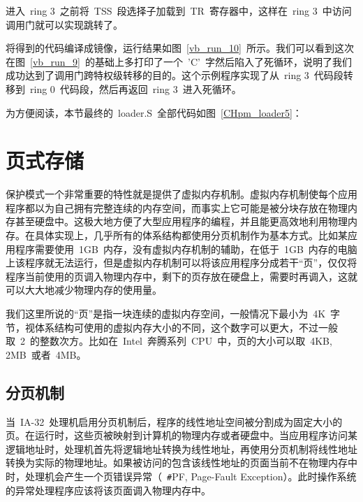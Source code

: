 进入~ring 3~之前将~TSS~段选择子加载到~TR~寄存器中，这样在~ring 3~中访问调用门就可以实现跳转了。

\label{CHpm_tss_load}

将得到的代码编译成镜像，运行结果如图~\ref{vb_run_10}~所示。我们可以看到这次在图~\ref{vb_run_9}~的基础上多打印了一个~'C'~字然后陷入了死循环，说明了我们成功达到了调用门跨特权级转移的目的。这个示例程序实现了从~ring 3~代码段转移到~ring 0~代码段，然后再返回~ring 3~进入死循环。


为方便阅读，本节最终的~loader.S~全部代码如图~\ref{CHpm_loader5}：

\label{CHpm_loader5}

\section{页式存储}

保护模式一个非常重要的特性就是提供了虚拟内存机制。虚拟内存机制使每个应用程序都以为自己拥有完整连续的内存空间，而事实上它可能是被分块存放在物理内存甚至硬盘中。这极大地方便了大型应用程序的编程，并且能更高效地利用物理内存。在具体实现上，几乎所有的体系结构都使用分页机制作为基本方式。比如某应用程序需要使用~1GB~内存，没有虚拟内存机制的辅助，在低于~1GB~内存的电脑上该程序就无法运行，但是虚拟内存机制可以将该应用程序分成若干“页”，仅仅将程序当前使用的页调入物理内存中，剩下的页存放在硬盘上，需要时再调入，这就可以大大地减少物理内存的使用量。

我们这里所说的“页”是指一块连续的虚拟内存空间，一般情况下最小为~4K~字节，视体系结构可使用的虚拟内存大小的不同，这个数字可以更大，不过一般取~2~的整数次方。比如在~Intel~奔腾系列~CPU~中，页的大小可以取~4KB, 2MB~或者~4MB。

\subsection{分页机制}

当~IA-32~处理机启用分页机制后，程序的线性地址空间被分割成为固定大小的页。在运行时，这些页被映射到计算机的物理内存或者硬盘中。当应用程序访问某逻辑地址时，处理机首先将逻辑地址转换为线性地址，再使用分页机制将线性地址转换为实际的物理地址。如果被访问的包含该线性地址的页面当前不在物理内存中时，处理机会产生一个页错误异常（~\texttt{\#}PF, Page-Fault Exception）。此时操作系统的异常处理程序应该将该页面调入物理内存中。

